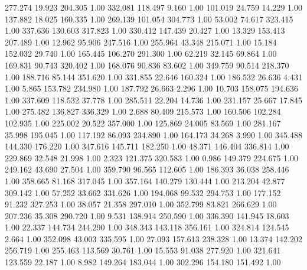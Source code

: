  277.274   19.923  204.305         1.00
 332.081  118.497    9.160         1.00
 101.019   24.759   14.229         1.00
 137.882   18.025  160.335         1.00
 269.139  101.054  304.773         1.00
  53.002   74.617  323.415         1.00
 337.636  130.603  317.823         1.00
 330.412  147.439   20.427         1.00
  13.329  153.413  207.489         1.00
  12.962   95.906  247.516         1.00
 255.964   43.348  215.071         1.00
  15.184  152.032   29.740         1.00
 165.445  106.270  291.300         1.00
  62.219   32.145   69.864         1.00
 169.831   90.743  320.402         1.00
 168.076   90.836   83.602         1.00
 349.759   90.514  218.370         1.00
 188.716   85.144  351.620         1.00
 331.855   22.646  160.324         1.00
 186.532   26.636    4.431         1.00
   5.865  153.782  234.980         1.00
 187.792   26.663    2.296         1.00
  10.703  158.075  194.636         1.00
 337.609  118.532   37.778         1.00
 285.511   22.204   14.736         1.00
 231.157   25.667   17.845         1.00
 275.482  136.827  336.329         1.00
   2.688   80.409  215.573         1.00
 160.506  102.284  102.935         1.00
 225.002   20.522  357.000         1.00
 125.869   24.005   83.569         1.00
 281.167   35.998  195.045         1.00
 117.192   86.093  234.890         1.00
 164.173   34.268    3.990         1.00
 345.488  144.330  176.220         1.00
 347.616  145.711  182.250         1.00
  48.371  146.404  336.814         1.00
 229.869   32.548   21.998         1.00
   2.323  121.375  320.583         1.00
   0.986  149.379  224.675         1.00
 249.162   43.690   27.504         1.00
 359.790   96.565  112.605         1.00
 186.393   36.038  258.446         1.00
 358.665   81.168  317.045         1.00
 357.164  140.279  130.444         1.00
 213.204   42.877  309.142         1.00
  57.252   33.662  331.626         1.00
 194.068   99.532  294.753         1.00
 177.152   91.232  327.253         1.00
  38.057   21.358  297.010         1.00
 352.799   83.821  266.629         1.00
 207.236   35.308  290.720         1.00
   9.531  138.914  250.590         1.00
 336.390  141.945   18.603         1.00
  22.337  144.734  244.290         1.00
 348.343  143.118  356.161         1.00
 324.814  124.545    2.664         1.00
 352.098   43.003  335.595         1.00
  27.093  157.613  238.328         1.00
  13.374  142.202  256.719         1.00
 255.463  113.569   30.761         1.00
  15.553   91.038  277.920         1.00
 321.641  123.559   22.187         1.00
   8.982  149.264  183.044         1.00
 302.296  154.180  151.492         1.00
